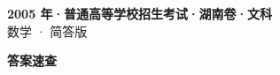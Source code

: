 \documentclass[zihao=-4, a4paper]{ctexart}
\begin{document}
\begin{center}
  {\Large\bfseries 2005 年·普通高等学校招生考试·湖南卷·文科}\\[4pt]
  {\large 数学 · 简答版}
\end{center}
\medskip
{}

\clearpage
{}
\begin{center}{\Large\bfseries 答案速查}\end{center}
\medskip

\end{document}
